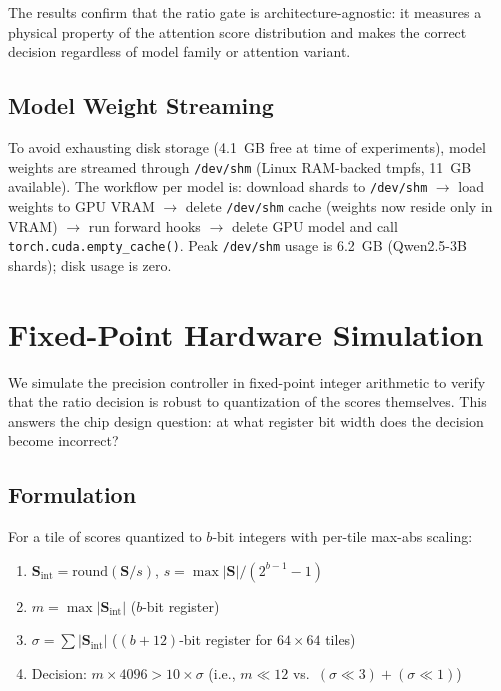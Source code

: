 \documentclass[10pt,twocolumn]{article}
\begin{document}
The results confirm that the ratio gate is architecture-agnostic: it
measures a physical property of the attention score distribution and
makes the correct decision regardless of model family or attention variant.

\subsection{Model Weight Streaming}
\label{sec:streaming}

To avoid exhausting disk storage (4.1~GB free at time of experiments),
model weights are streamed through \texttt{/dev/shm} (Linux RAM-backed
tmpfs, 11~GB available). The workflow per model is: download shards to
\texttt{/dev/shm} $\to$ load weights to GPU VRAM $\to$ delete
\texttt{/dev/shm} cache (weights now reside only in VRAM) $\to$ run
forward hooks $\to$ delete GPU model and call
\texttt{torch.cuda.empty\_cache()}. Peak \texttt{/dev/shm} usage is
6.2~GB (Qwen2.5-3B shards); disk usage is zero.

\section{Fixed-Point Hardware Simulation}
\label{sec:fixedpoint}

We simulate the precision controller in fixed-point integer arithmetic
to verify that the ratio decision is robust to quantization of the
scores themselves. This answers the chip design question: at what
register bit width does the decision become incorrect?

\subsection{Formulation}

For a tile of scores quantized to $b$-bit integers with per-tile
max-abs scaling:
\begin{enumerate}
  \item $\mathbf{S}_\text{int} = \mathrm{round}(\mathbf{S} / s)$,\;
    $s = \max|\mathbf{S}| / (2^{b-1}-1)$
  \item $m = \max|\mathbf{S}_\text{int}|$ \quad ($b$-bit register)
  \item $\sigma = \sum|\mathbf{S}_\text{int}|$ \quad ($(b+12)$-bit register
    for $64\times64$ tiles)
  \item Decision: $m \times 4096 > 10 \times \sigma$
    (i.e., $m \ll 12$ vs.\ $(\sigma \ll 3) + (\sigma \ll 1)$)
\end{enumerate}
\end{document}
